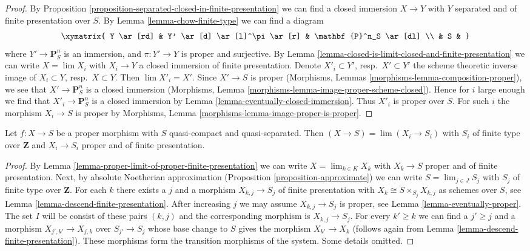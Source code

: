 \begin{proof}
By Proposition \ref{proposition-separated-closed-in-finite-presentation}
we can find a closed immersion $X \to Y$ with $Y$ separated and of
finite presentation over $S$. By Lemma \ref{lemma-chow-finite-type}
we can find a diagram
$$
\xymatrix{
Y \ar[rd] & Y' \ar[d] \ar[l]^\pi \ar[r] & \mathbf{P}^n_S \ar[dl] \\
& S &
}
$$
where $Y' \to \mathbf{P}^n_S$ is an immersion, and
$\pi : Y' \to Y$ is proper and surjective. By
Lemma \ref{lemma-closed-is-limit-closed-and-finite-presentation}
we can write $X = \lim X_i$ with $X_i \to Y$ a closed immersion of
finite presentation. Denote $X'_i \subset Y'$, resp.\ $X' \subset Y'$
the scheme theoretic inverse image of $X_i \subset Y$, resp.\ $X \subset Y$.
Then $\lim X'_i = X'$. Since $X' \to S$ is proper
(Morphisms, Lemmas \ref{morphisms-lemma-composition-proper}), we see that
$X' \to \mathbf{P}^n_S$ is a closed immersion (Morphisms, Lemma
\ref{morphisms-lemma-image-proper-scheme-closed}). Hence for $i$ large enough
we find that $X'_i \to \mathbf{P}^n_S$ is a closed immersion by
Lemma \ref{lemma-eventually-closed-immersion}.
Thus $X'_i$ is proper over $S$.
For such $i$ the morphism $X_i \to S$ is proper by
Morphisms, Lemma \ref{morphisms-lemma-image-proper-is-proper}.
\end{proof}

\begin{lemma}
\label{lemma-proper-limit-of-proper-finite-presentation-noetherian}
Let $f : X \to S$ be a proper morphism with $S$ quasi-compact and
quasi-separated. Then $(X \to S) = \lim (X_i \to S_i)$ with
$S_i$ of finite type over $\mathbf{Z}$ and $X_i \to S_i$ proper and
of finite presentation.
\end{lemma}

\begin{proof}
By Lemma \ref{lemma-proper-limit-of-proper-finite-presentation}
we can write $X = \lim_{k \in K} X_k$ with $X_k \to S$ proper and
of finite presentation. Next, by absolute Noetherian approximation
(Proposition \ref{proposition-approximate}) we can
write $S = \lim_{j \in J} S_j$ with $S_j$ of finite type over $\mathbf{Z}$.
For each $k$ there exists a $j$ and a morphism $X_{k, j} \to S_j$
of finite presentation with $X_k \cong S \times_{S_j} X_{k, j}$
as schemes over $S$, see
Lemma \ref{lemma-descend-finite-presentation}.
After increasing $j$ we may assume $X_{k, j} \to S_j$ is proper, see
Lemma \ref{lemma-eventually-proper}. The set $I$ will be consist
of these pairs $(k, j)$ and the corresponding morphism is $X_{k, j} \to S_j$.
For every $k' \geq k$ we can find a $j' \geq j$ and a morphism
$X_{j', k'} \to X_{j, k}$ over $S_{j'} \to S_j$ whose base change to $S$
gives the morphism $X_{k'} \to X_k$ (follows again from
Lemma \ref{lemma-descend-finite-presentation}).
These morphisms form the transition morphisms of the system. Some details
omitted.
\end{proof}


